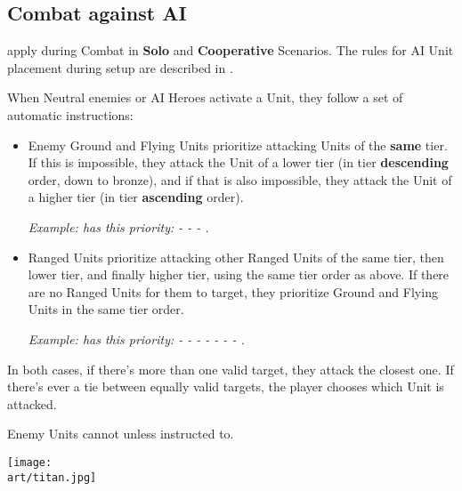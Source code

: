 \begin{multicols}{2}
\subsection*{Combat against AI}

 apply during Combat in \textbf{Solo} and \textbf{Cooperative} Scenarios.
The rules for AI Unit placement during setup are described in .

When Neutral enemies or AI Heroes activate a Unit, they follow a set of automatic instructions:\par

\begin{itemize}
  \item Enemy Ground  and Flying  Units prioritize attacking Units of the \textbf{same} tier.
  If this is impossible, they attack the Unit of a lower tier (in tier \textbf{descending} order, down to bronze), and if that is also impossible, they attack the Unit of a higher tier (in tier \textbf{ascending} order).\par

  \textit{Example:  has this priority:
  - 
  - 
  - .}

  \item Ranged  Units prioritize attacking other Ranged  Units of the same tier, then lower tier, and finally higher tier, using the same tier order as above.
  If there are no Ranged  Units for them to target, they prioritize Ground  and Flying  Units in the same tier order.\par

  \textit{Example:  has this priority:
  - 
  - 
  - 
  - 
  - 
  - 
  - .}
\end{itemize}

In both cases, if there's more than one valid target, they attack the closest one.
If there's ever a tie between equally valid targets, the player chooses which Unit is attacked.\par

Enemy Units cannot  unless instructed to.

\vfill

\begin{center}
    \texttt{[image: \\art/titan.jpg]}
\end{center}

\end{multicols}
